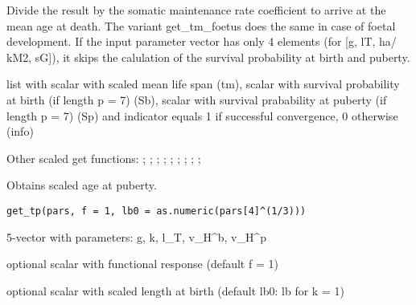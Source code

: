 \documentclass[a4paper]{book}
\begin{document}
%
\begin{Details}\relax
Divide the result by the somatic maintenance rate coefficient to arrive at the mean age at death.
The variant get\_tm\_foetus does the same in case of foetal development.
If the input parameter vector has only 4 elements (for [g, lT, ha/ kM2, sG]),
it skips the calulation of the survival probability at birth and puberty.
\end{Details}
%
\begin{Value}
list with  scalar with scaled mean life span (tm),
scalar with survival probability at birth (if length p = 7) (Sb),
scalar with survival prabability at puberty (if length p = 7) (Sp)
and indicator equals 1 if successful convergence, 0 otherwise (info)
\end{Value}
%
\begin{SeeAlso}\relax
Other scaled get functions: ;
; ;
; ;
; ;
;
;
\end{SeeAlso}
%
\begin{Description}\relax
Obtains scaled age at puberty.
\end{Description}
%
\begin{Usage}
\begin{verbatim}
get_tp(pars, f = 1, lb0 = as.numeric(pars[4]^(1/3)))
\end{verbatim}
\end{Usage}
%
\begin{Arguments}
\begin{ldescription}
\item[\code{pars}] 5-vector with parameters: g, k, l\_T, v\_H\textasciicircum{}b, v\_H\textasciicircum{}p

\item[\code{f}] optional scalar with functional response (default f = 1)

\item[\code{lb0}] optional scalar with scaled length at birth (default lb0: lb for k = 1)
\end{ldescription}
\end{Arguments}
\end{document}
